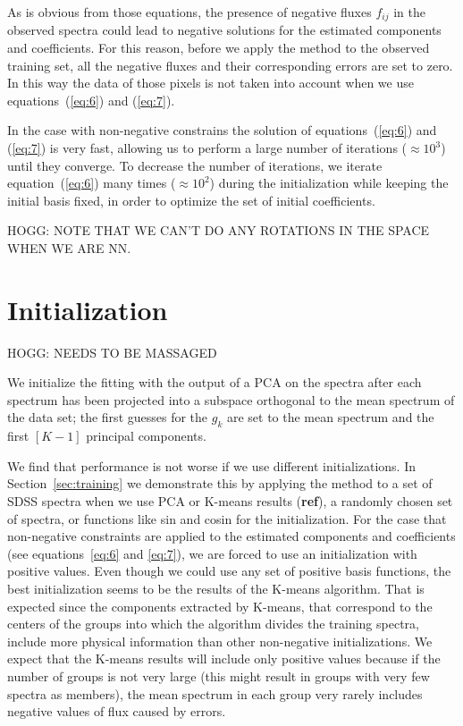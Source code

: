 \documentclass[12pt,preprint]{aastex}
\newcommand{\sectionname}{Section}
\newcommand{\equationname}{equation}
\begin{document}
As is obvious from those equations, the presence of negative fluxes
$f_{ij}$ in the observed spectra could lead to negative solutions for
the estimated components and coefficients. For this reason, before we
apply the method to the observed training set, all the negative fluxes
and their corresponding errors are set to zero. In this way the data
of those pixels is not taken into account when we use
{\equationname}s~(\ref{eq:6}) and (\ref{eq:7}).

In the case with non-negative constrains the solution of
{\equationname}s~(\ref{eq:6}) and (\ref{eq:7}) is very fast, allowing
us to perform a large number of iterations ($\approx 10^3$) until they
converge. To decrease the number of iterations, we iterate
\equationname~(\ref{eq:6}) many times ($\approx 10^2$) during the
initialization while keeping the initial basis fixed, in order to
optimize the set of initial coefficients.

HOGG: NOTE THAT WE CAN'T DO ANY ROTATIONS IN THE SPACE WHEN WE ARE NN.

\section{Initialization}\label{sec:initialization}

HOGG:  NEEDS TO BE MASSAGED

 We initialize the fitting with the
output of a PCA on the spectra after each spectrum has been projected
into a subspace orthogonal to the mean spectrum of the data set; the
first guesses for the $g_{k}$ are set to the mean spectrum and the
first $[K-1]$ principal components.

We find that performance is not worse if we use different
initializations. In \sectionname~\ref{sec:training} we demonstrate
this by applying the method to a set of SDSS spectra when we use PCA
or K-means results (\textbf{ref}), a randomly chosen set of spectra,
or functions like sin and cosin for the initialization. For the case
that non-negative constraints are applied to the estimated components
and coefficients (see {\equationname}s~\ref{eq:6} and \ref{eq:7}), we
are forced to use an initialization with positive values. Even though
we could use any set of positive basis functions, the best
initialization seems to be the results of the K-means algorithm. That
is expected since the components extracted by K-means, that correspond
to the centers of the groups into which the algorithm divides the
training spectra, include more physical information than other
non-negative initializations. We expect that the K-means results will
include only positive values because if the number of groups is not
very large (this might result in groups with very few spectra as
members), the mean spectrum in each group very rarely includes
negative values of flux caused by errors.
\end{document}

